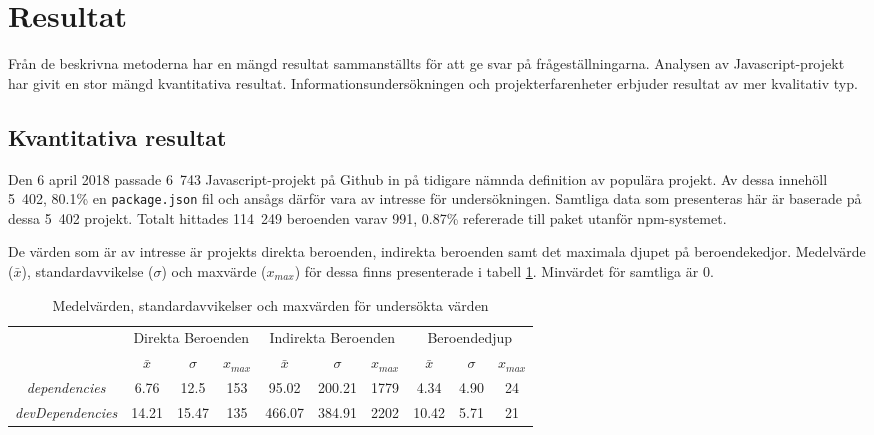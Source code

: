 \section{Resultat}
\label{sec:joel_o-results}
Från de beskrivna metoderna har en mängd resultat sammanställts för att ge svar på frågeställningarna. Analysen av Javascript-projekt har givit en stor mängd kvantitativa resultat. Informationsundersökningen och projekterfarenheter erbjuder resultat av mer kvalitativ typ.

\subsection{Kvantitativa resultat}
\label{sec:joel_o-results-kvant}
Den 6 april 2018 passade 6~743 Javascript-projekt på Github in på tidigare nämnda definition av populära projekt. Av dessa innehöll 5~402, 80.1\% en \texttt{package.json} fil och ansågs därför vara av intresse för undersökningen. Samtliga data som presenteras här är baserade på dessa 5~402 projekt. Totalt hittades 114~249 beroenden varav 991, 0.87\% refererade till paket utanför npm-systemet.

De värden som är av intresse är projekts direkta beroenden, indirekta beroenden samt det maximala djupet på beroendekedjor. Medelvärde ($\bar{x}$), standardavvikelse ($\sigma$) och maxvärde ($x_{max}$) för dessa finns presenterade i tabell \ref{tab:beroende-data}. Minvärdet för samtliga är 0.

\begin{table}[H]
  \centering
  \begin{tabular}{c | c c c | c c c | c c c |}
    \cline{2-10}
    & \multicolumn{3}{c|}{Direkta Beroenden} & \multicolumn{3}{c|}{Indirekta Beroenden} & \multicolumn{3}{c|}{Beroendedjup} \\ \cline{2-10}
    & $\bar{x}$ & $\sigma$ & $x_{max}$ & $\bar{x}$ & $\sigma$ & $x_{max}$ & $\bar{x}$ & $\sigma$ & $x_{max}$ \\ \hline
    \multicolumn{1}{|c|}{\textit{dependencies}} & 6.76 & 12.5 & 153 & 95.02 & 200.21 & 1779 & 4.34 & 4.90 & 24 \\ \hline
    \multicolumn{1}{|c|}{\textit{devDependencies}} & 14.21 & 15.47 & 135 & 466.07 & 384.91 & 2202 & 10.42 & 5.71 & 21 \\
    \hline
  \end{tabular}
  \caption{Medelvärden, standardavvikelser och maxvärden för undersökta värden}
  \label{tab:beroende-data}
\end{table}

